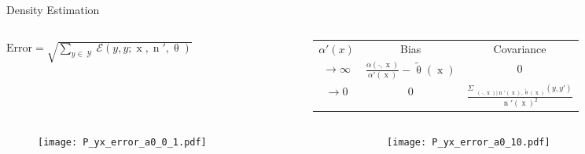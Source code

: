\documentclass[xcolor=dvipsnames]{beamer}
\DeclareMathOperator{\xrm}{\mathrm{x}}
\DeclareMathOperator{\nrm}{\mathrm{n}}
\DeclareMathOperator{\nbarrm}{\bar{\mathrm{n}}}
\DeclareMathOperator{\Ycal}{\mathcal{Y}}
\begin{document}
\begin{frame}{}
\begin{columns}[T]
\begin{column}{.34\linewidth}
\begin{block}{Density Estimation}
\begin{columns}[c]
\begin{column}{.48\linewidth}
\vspace{0.5cm}
$\mathrm{Error} = \sqrt{\sum_{y \in \Ycal} \mathcal{E}(y,y ; \xrm,\nrm',\uptheta)}$

\end{column}
\begin{column}{.48\linewidth}

\begin{table}
\renewcommand{\arraystretch}{1.5}
\begin{tabular}{| c | c | c |}
\hline 
$\alpha'(x)$ & Bias & Covariance \\
\hhline{|=|=|=|}
$\to \infty$ & $\frac{\alpha(\cdot,\xrm)}{\alpha'(\xrm)} - \tilde{\uptheta}(\xrm)$ & 0 \\ 
\hline
$\to 0$ & 0 & $\frac{\Sigma_{\nbarrm(\cdot,\xrm) | \nrm'(\xrm),\tilde{\uptheta}(\xrm)}(y,y')}{\nrm'(\xrm)^2}$ \\
\hline
\end{tabular}
\end{table}

\end{column}
\end{columns}



\vspace{1cm}



\begin{columns}[t]
\begin{column}{.5\linewidth}

\begin{figure}
\centering
\texttt{[image: P\_yx\_error\_a0\_0\_1.pdf]}
\end{figure}

\end{column}
\begin{column}{.5\linewidth}

\begin{figure}
\centering
\texttt{[image: P\_yx\_error\_a0\_10.pdf]}
\end{figure}

\end{column}
\end{columns}



\end{block}  
    
\end{column}




\end{columns}


\end{frame}
\end{document}
